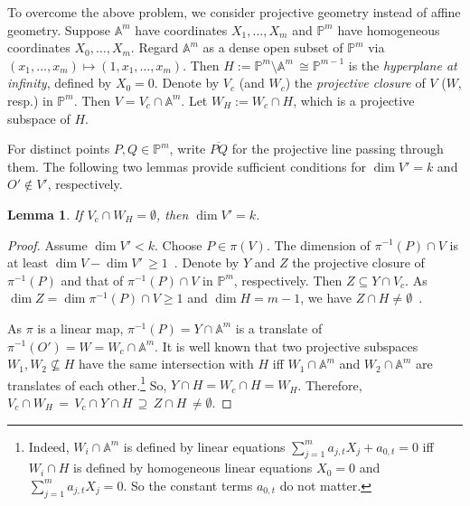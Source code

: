 \documentclass[11pt]{article}
\numberwithin{equation}{section}
\newtheorem{lemma}[theorem]{Lemma}
\theoremstyle{definition}
\theoremstyle{plain}
\newcommand{\aff}{\mathbb{A}}
\newcommand{\proj}{\mathbb{P}}
\begin{document}
  To overcome the above problem, we consider projective geometry instead of affine geometry.
  Suppose $\aff^m$ have coordinates $X_1,\dots,X_m$ and $\proj^m$ have homogeneous coordinates $X_0,\ldots,X_m$.
  Regard $\aff^m$ as a dense open subset of $\proj^m$ via $(x_1,\dots,x_m)\mapsto (1,x_1,\dots,x_m)$. Then $H:= \proj^m\setminus \aff^m \,\cong \proj^{m-1}$ is the \emph{hyperplane at infinity}, defined by $X_0=0$.
Denote by $V_c$
%
(and $W_c$)   %
the \emph{projective closure} of $V$
%
($W$, resp.)   %
in $\proj^m$. Then $V = V_c\cap \aff^m$.
  Let $W_H:= W_c\cap H$, which is a projective subspace of $H$. 
  
  For distinct points $P,Q\in\proj^m$, write $\overline{PQ}$ for the projective line passing through them.  The following two lemmas  provide sufficient conditions for $\dim V'=k$ and $O'\not\in V'$, respectively.
%
%
\begin{lemma}\label{lem_projcriterion}  
 If $V_c\cap W_H=\emptyset$, then  $\dim V'=k$.
\end{lemma}

\begin{proof}
Assume $\dim V'<k$. Choose $P\in\pi(V)$. The dimension of $\pi^{-1}(P)\cap V$ is at least $\dim V-\dim V' \,\geq 1$~\cite[Theorem~11.12]{Har92}.
Denote by $Y$ and $Z$  the projective closure of $\pi^{-1}(P)$ and that of $\pi^{-1}(P)\cap V$ in $\proj^m$, respectively.
%
Then $Z\subseteq Y\cap V_c$. As $\dim Z=\dim \pi^{-1}(P)\cap V\geq 1$ and $\dim H=m-1$, we have $Z\cap H\neq\emptyset$~\cite[Proposition~11.4]{Har92}. 

As $\pi$ is a linear map, $\pi^{-1}(P)=Y\cap\aff^m$ is a translate of $\pi^{-1}(O')= W =W_c\cap\aff^m$. It is well known that two projective subspaces $W_1,W_2\not\subseteq H$ have the same intersection with $H$ iff $W_1\cap \aff^m$ and $W_2\cap \aff^m$ are translates of each other.\footnote{Indeed, $W_i\cap \aff^m$ is defined by linear equations $\sum_{j=1}^m a_{j,t} X_j +a_{0,t}=0$ iff $W_i\cap H$ is defined by homogeneous linear equations $X_0=0$ and $\sum_{j=1}^m a_{j,t} X_j=0$. So the constant terms $a_{0,t}$ do not matter.}
So, $Y\cap H=W_c\cap H=W_H$. Therefore,
$V_c\cap W_H \,=\, V_c\cap Y\cap H \,\supseteq\, Z\cap H \,\neq \emptyset$.
\end{proof}
\end{document}
